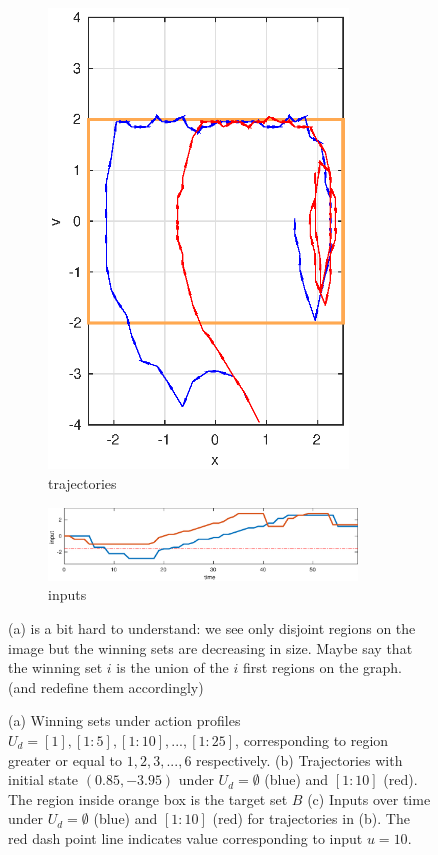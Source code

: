 \begin{figure}
\begin{subfigure}[b]{0.235\textwidth}
		\includegraphics[width=0.875\textwidth]{pic/traj}
		\caption{trajectories}
		\label{fig:traj}
	\end{subfigure}
	\begin{subfigure}[b]{0.5\textwidth}
		
		\includegraphics[width=0.9\textwidth]{pic/input}
		\caption{inputs}
		\label{fig:input}
	\end{subfigure}
	\caption{(a) Winning sets under action profiles $U_d = [1], [1:5],[1:10],...,[1:25]$, corresponding to region greater or equal to $1, 2,3, ...,6$ respectively. (b) Trajectories with initial state $ (0.85,-3.95) $ under $ U_d = \emptyset $ (blue) and $[1:10] $ (red). The region inside orange box is the target set $ B $ (c) Inputs over time under $ U_d = \emptyset $ (blue) and $ [1:10] $ (red) for trajectories in (b). The red dash point line indicates value corresponding to input $ u = 10 $.} {\color{purple} (a) is a bit hard to understand: we  see only disjoint regions on the image but the winning sets are decreasing in size. Maybe say that the winning set $i$ is the union of the $i$ first regions on the graph. (and redefine them accordingly)}
\end{figure}

